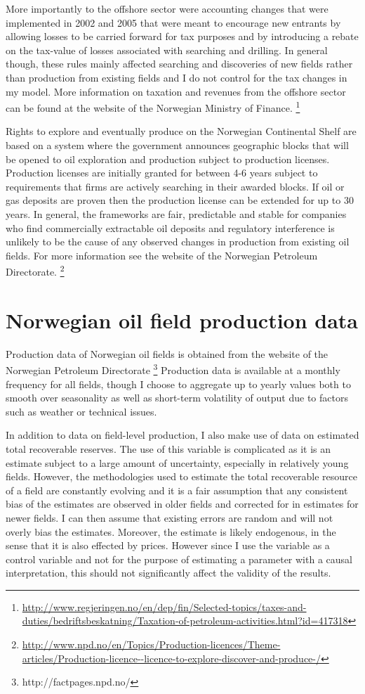 \documentclass[12pt]{article}
\begin{document}
More importantly to the offshore sector were accounting changes that were implemented in 2002 and 2005 that were meant to encourage new entrants by allowing losses to be carried forward for tax purposes and by introducing a rebate on the tax-value of losses associated with searching and drilling.  In general though, these rules mainly affected searching and discoveries of new fields rather than production from existing fields and I do not control for the tax changes in my model.  More information on taxation and revenues from the offshore sector can be found at the website of the Norwegian Ministry of Finance. \footnote{\url{http://www.regjeringen.no/en/dep/fin/Selected-topics/taxes-and-duties/bedriftsbeskatning/Taxation-of-petroleum-activities.html?id=417318}}

Rights to explore and eventually produce on the Norwegian Continental Shelf are based on a system where the government announces geographic blocks that will be opened to oil exploration and production subject to production licenses.  Production licenses are initially granted for between 4-6 years subject to requirements that firms are actively searching in their awarded blocks.  If oil or gas deposits are proven then the production license can be extended for up to 30 years.  In general, the frameworks are fair, predictable and stable for companies who find commercially extractable oil deposits and regulatory interference is unlikely to be the cause of any observed changes in production from existing oil fields.  For more information see the website of the Norwegian Petroleum Directorate. \footnote{\url{http://www.npd.no/en/Topics/Production-licences/Theme-articles/Production-licence--licence-to-explore-discover-and-produce-/}}

\section{Norwegian oil field production data}
Production data of Norwegian oil fields is obtained from the website of the Norwegian Petroleum Directorate \footnote{http://factpages.npd.no/}  Production data is available at a monthly frequency for all fields, though I choose to aggregate up to yearly values both to smooth over seasonality as well as short-term volatility of output due to factors such as weather or technical issues.  

In addition to data on field-level production, I also make use of data on estimated total recoverable reserves.  The use of this variable is complicated as it is an estimate subject to a large amount of uncertainty, especially in relatively young fields.  However, the methodologies used to estimate the total recoverable resource of a field are constantly evolving and it is a fair assumption that any consistent bias of the estimates are observed in older fields and corrected for in estimates for newer fields.  I can then assume that existing errors are random and will not overly bias the estimates.  Moreover, the estimate is likely endogenous, in the sense that it is also effected by prices.  However since I use the variable as a control variable and not for the purpose of estimating a parameter with a causal interpretation, this should not significantly affect the validity of the results.  
\end{document}
